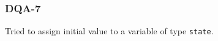 \subsubsection{DQA-7}\label{sec:error_code_dqa_7}

Tried to assign initial value to a variable of type \texttt{state}.


